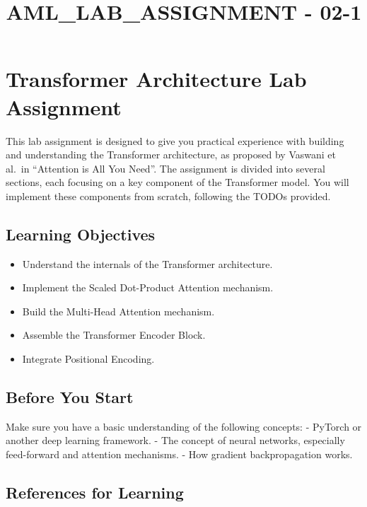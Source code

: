 \documentclass[11pt]{article}
\title{AML\_LAB\_ASSIGNMENT - 02-1}
\providecommand{\tightlist}{%
      \setlength{\itemsep}{0pt}\setlength{\parskip}{0pt}}
\begin{document}
    
    \maketitle
    
    

    
    \section{Transformer Architecture Lab
Assignment}\label{transformer-architecture-lab-assignment}

This lab assignment is designed to give you practical experience with
building and understanding the Transformer architecture, as proposed by
Vaswani et al.~in ``Attention is All You Need''. The assignment is
divided into several sections, each focusing on a key component of the
Transformer model. You will implement these components from scratch,
following the TODOs provided.

\subsection{Learning Objectives}\label{learning-objectives}

\begin{itemize}
\tightlist
\item
  Understand the internals of the Transformer architecture.
\item
  Implement the Scaled Dot-Product Attention mechanism.
\item
  Build the Multi-Head Attention mechanism.
\item
  Assemble the Transformer Encoder Block.
\item
  Integrate Positional Encoding.
\end{itemize}

\subsection{Before You Start}\label{before-you-start}

Make sure you have a basic understanding of the following concepts: -
PyTorch or another deep learning framework. - The concept of neural
networks, especially feed-forward and attention mechanisms. - How
gradient backpropagation works.

\subsection{References for Learning}\label{references-for-learning}
\end{document}
